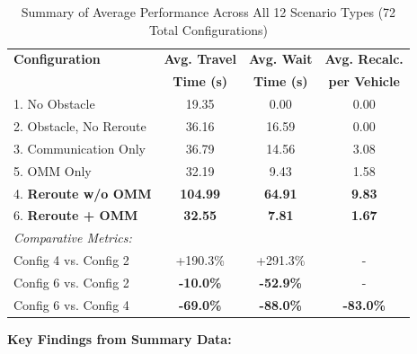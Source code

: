 \documentclass[conference]{IEEEtran}
\begin{document}
\begin{table}[H]
\centering
\caption{Summary of Average Performance Across All 12 Scenario Types (72 Total Configurations)}
\label{tab:summary_results}
\begin{tabular}{|l|c|c|c|}
\hline
\textbf{Configuration} & \textbf{Avg. Travel} & \textbf{Avg. Wait} & \textbf{Avg. Recalc.} \\
& \textbf{Time (s)} & \textbf{Time (s)} & \textbf{per Vehicle} \\
\hline
1. No Obstacle & 19.35 & 0.00 & 0.00 \\
\hline
2. Obstacle, No Reroute & 36.16 & 16.59 & 0.00 \\
\hline
3. Communication Only & 36.79 & 14.56 & 3.08 \\
\hline
5. OMM Only & 32.19 & 9.43 & 1.58 \\
\hline
\rowcolor{red!20}
4. \textbf{Reroute w/o OMM} & \textbf{104.99} & \textbf{64.91} & \textbf{9.83} \\
\hline
\rowcolor{green!20}
6. \textbf{Reroute + OMM} & \textbf{32.55} & \textbf{7.81} & \textbf{1.67} \\
\hline
\hline
\multicolumn{4}{|l|}{\textit{Comparative Metrics:}} \\
\hline
Config 4 vs. Config 2 & +190.3\% & +291.3\% & - \\
Config 6 vs. Config 2 & \textbf{-10.0\%} & \textbf{-52.9\%} & - \\
Config 6 vs. Config 4 & \textbf{-69.0\%} & \textbf{-88.0\%} & \textbf{-83.0\%} \\
\hline
\end{tabular}
\end{table}

\textbf{Key Findings from Summary Data:}
\end{document}
